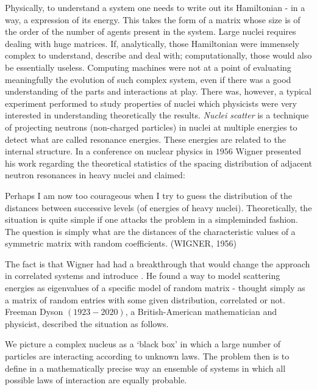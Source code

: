Physically, to understand a system one needs to write out its Hamiltonian - in a way, a expression of its energy. This takes the form of a matrix whose size is of the order of the number of agents present in the system. Large nuclei requires dealing with huge matrices. If, analytically, those Hamiltonian were immensely complex to understand, describe and deal with; computationally, those would also be essentially useless. Computing machines were not at a point of evaluating meaningfully the evolution of such complex system, even if there was a good understanding of the parts and interactions at play. There was, however, a typical experiment performed to study properties of nuclei which physicists were very interested in understanding theoretically the results. \textit{Nuclei scatter} is a technique of projecting neutrons (non-charged particles) in nuclei at multiple energies to detect what are called resonance energies. These energies are related to the internal structure. In a conference on nuclear physics in $1956$ Wigner presented his work regarding the theoretical statistics of the spacing distribution of adjacent neutron resonances in heavy nuclei and claimed:

\begin{citacao}[english]
	Perhaps I am now too courageous when I try to guess the distribution of the distances between successive levels (of energies of heavy nuclei). Theoretically, the situation is quite simple if one attacks the problem in a simpleminded fashion. The question is simply what are the distances of the characteristic values of a symmetric matrix with random coefficients. (WIGNER, 1956)
\end{citacao}

The fact is that Wigner had had a breakthrough that would change the approach in correlated systems and introduce . He found a way to model scattering energies as eigenvalues of a specific model of random matrix - thought simply as a matrix of random entries with some given distribution, correlated or not. Freeman Dyson $(1923 - 2020)$, a British-American mathematician and physicist, described the situation as follows. 

\begin{citacao}
	We picture a complex nucleus as a ‘black box’ in which a large number of particles are interacting according to unknown laws. The problem then is to define in a mathematically precise way an ensemble of systems in which all possible laws of interaction are equally probable. \cite{Dyson1962es}
\end{citacao}

